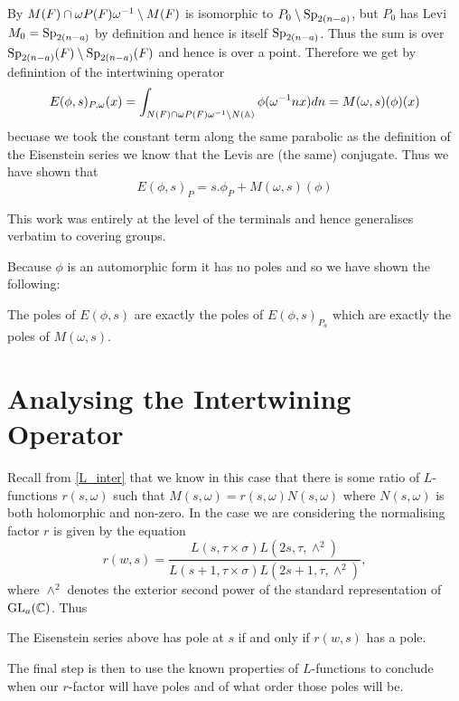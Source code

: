      By \cite[2C]{jiangPolesCertainResidual2013} \(M(F)\cap \omega P(F)\omega^{-1} \setminus M(F)\) is isomorphic to \(P_0 \setminus \operatorname{Sp}_{2(n-a)}\), but \(P_0\) has Levi \(M_0 = \operatorname{Sp}_{2(n-a)}\) by definition and hence is itself \(\operatorname{Sp}_{2(n-a)}\). Thus the sum is over \(\operatorname{Sp}_{2(n-a)}(F) \setminus \operatorname{Sp}_{2(n-a)}(F)\) and hence is over a point. Therefore we get by definintion of the intertwining operator
     \[E(\phi, s)_{P, \omega}(x) = \int_{N(F)\cap \omega P(F)\omega\inv \setminus N(\A)} \phi( \omega\inv n x)  dn = M(\omega, s)(\phi)(x)\]
     becuase we took the constant term along the same parabolic as the definition of the Eisenstein series we know that the Levis are (the same) conjugate.
    Thus we have shown that 
    \[E(\phi, s)_P = s.\phi_P + M(\omega, s )(\phi)\]
    \begin{remark}
        This work was entirely at the level of the terminals and hence generalises verbatim to covering groups.
    \end{remark}
    
    Because \(\phi\) is an automorphic form it has no poles and so we have shown the following:
    \begin{Lemma}
        The poles of \(E(\phi, s)\) are exactly the poles of \(E(\phi,s)_{P_a}\) which are exactly the poles of \(M(\omega, s)\).
    \end{Lemma}

    \section{Analysing the Intertwining Operator}
    Recall from \ref{L_inter} that we know in this case that there is some ratio of \(L\)-functions \(r(s, \omega)\) such that \(M(s,\omega) = r(s, \omega)N(s, \omega)\) where \(N(s, \omega)\) is both holomorphic and non-zero. 
     In the case we are considering the normalising factor \(r\) is given by the equation \cite[4A]{jiangPolesCertainResidual2013}
     \[r(w, s) = \frac{L(s, \tau\times \sigma)L(2s, \tau,\wedge^2)}{L(s+1, \tau\times \sigma)L(2s+1, \tau, \wedge^2)},\]
    where \(\wedge^2\) denotes the exterior second power of the standard representation of \(\GL_a(\C)\). Thus

     \begin{Lemma}
        The Eisenstein series above has pole at \(s\) if and only if \(r(w,s)\) has a pole.
     \end{Lemma}
     The final step is then to use the known properties of \(L\)-functions to conclude when our \(r\)-factor will have poles and of what order those poles will be.

